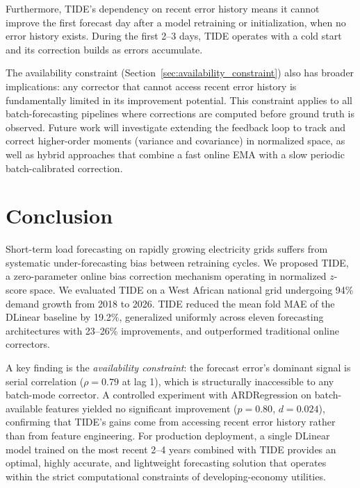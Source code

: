 \documentclass[11pt,letterpaper]{article}
\begin{document}
Furthermore, TIDE's dependency on recent error history means it cannot improve the first forecast day after a model retraining or initialization, when no error history exists. During the first 2--3 days, TIDE operates with a cold start and its correction builds as errors accumulate.

The availability constraint (Section~\ref{sec:availability_constraint}) also has broader implications: any corrector that cannot access recent error history is fundamentally limited in its improvement potential. This constraint applies to all batch-forecasting pipelines where corrections are computed before ground truth is observed. Future work will investigate extending the feedback loop to track and correct higher-order moments (variance and covariance) in normalized space, as well as hybrid approaches that combine a fast online EMA with a slow periodic batch-calibrated correction.

\section{Conclusion}
\label{sec:conclusion}
Short-term load forecasting on rapidly growing electricity grids suffers from systematic under-forecasting bias between retraining cycles. We proposed TIDE, a zero-parameter online bias correction mechanism operating in normalized $z$-score space. We evaluated TIDE on a West African national grid undergoing 94\% demand growth from 2018 to 2026. TIDE reduced the mean fold MAE of the DLinear baseline by 19.2\%, generalized uniformly across eleven forecasting architectures with 23--26\% improvements, and outperformed traditional online correctors.

A key finding is the \emph{availability constraint}: the forecast error's dominant signal is serial correlation ($\rho = 0.79$ at lag 1), which is structurally inaccessible to any batch-mode corrector. A controlled experiment with ARDRegression on batch-available features yielded no significant improvement ($p = 0.80$, $d = 0.024$), confirming that TIDE's gains come from accessing recent error history rather than from feature engineering. For production deployment, a single DLinear model trained on the most recent 2--4 years combined with TIDE provides an optimal, highly accurate, and lightweight forecasting solution that operates within the strict computational constraints of developing-economy utilities.
\end{document}
